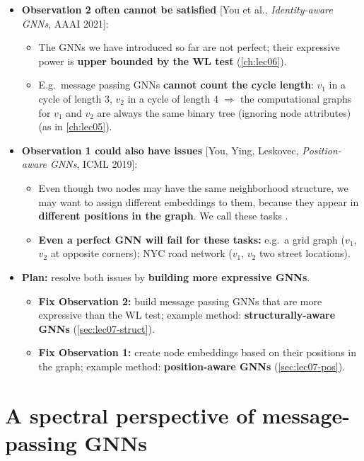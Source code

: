 \begin{itemize}
  \item \textbf{Observation 2 often cannot be satisfied} [You et al.,
    \emph{Identity-aware GNNs}, AAAI 2021]:
    \begin{itemize}
      \item The GNNs we have introduced so far are not perfect; their expressive
        power is \textbf{upper bounded by the WL test} (\cref{ch:lec06}).
      \item E.g.\ message passing GNNs \textbf{cannot count the cycle length}:
        $v_1$ in a cycle of length 3, $v_2$ in a cycle of length 4 $\Rightarrow$
        the computational graphs for $v_1$ and $v_2$ are always the same binary
        tree (ignoring node attributes) (as in \cref{ch:lec05}).
    \end{itemize}
  \item \textbf{Observation 1 could also have issues} [You, Ying, Leskovec,
    \emph{Position-aware GNNs}, ICML 2019]:
    \begin{itemize}
      \item Even though two nodes may have the same neighborhood structure, we may
        want to assign different embeddings to them, because they appear in
        \textbf{different positions in the graph}. We call these tasks
        .
      \item \textbf{Even a perfect GNN will fail for these tasks:} e.g.\ a grid
        graph ($v_1$, $v_2$ at opposite corners); NYC road network ($v_1$, $v_2$
        two street locations).
    \end{itemize}
  \item \textbf{Plan:} resolve both issues by \textbf{building more expressive
    GNNs}.
    \begin{itemize}
      \item \textbf{Fix Observation 2:} build message passing GNNs that are more
        expressive than the WL test; example method: \textbf{structurally-aware
        GNNs} (\cref{sec:lec07-struct}).
      \item \textbf{Fix Observation 1:} create node embeddings based on their
        positions in the graph; example method: \textbf{position-aware GNNs}
        (\cref{sec:lec07-pos}).
    \end{itemize}
\end{itemize}

\section{A spectral perspective of message-passing GNNs}\label{sec:lec07-spectral}

